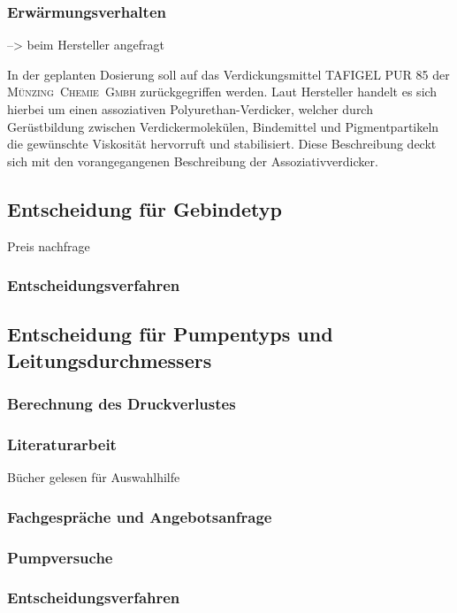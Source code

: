 \subsubsection{Erwärmungsverhalten}

--> beim Hersteller angefragt

In der geplanten Dosierung soll auf das Verdickungsmittel TAFIGEL PUR 85 der \mbox{\textsc{Münzing Chemie Gmbh}} zurückgegriffen werden. Laut Hersteller handelt es sich hierbei um einen assoziativen Polyurethan-Verdicker, welcher durch Gerüstbildung zwischen Verdickermolekülen, Bindemittel und Pigmentpartikeln die gewünschte Viskosität hervorruft und stabilisiert. Diese Beschreibung deckt sich mit den vorangegangenen Beschreibung der Assoziativverdicker.\cite{MunzingChemieGmbH.2014}\\


\subsection{Entscheidung für Gebindetyp}
Preis nachfrage
\subsubsection{Entscheidungsverfahren}

\subsection{Entscheidung für Pumpentyps und Leitungsdurchmessers}
\subsubsection{Berechnung des Druckverlustes}
\subsubsection{Literaturarbeit}
Bücher gelesen für Auswahlhilfe
\subsubsection{Fachgespräche und Angebotsanfrage}
\subsubsection{Pumpversuche}
\subsubsection{Entscheidungsverfahren}

